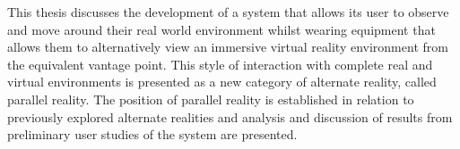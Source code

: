 This thesis discusses the development of a system that allows its user to observe and move around their real world environment whilst wearing equipment that allows them to alternatively view an immersive virtual reality environment from the equivalent vantage point. This style of interaction with complete real and virtual environments is presented as a new category of alternate reality, called parallel reality. The position of parallel reality is established in relation to previously explored alternate realities and analysis and discussion of results from preliminary user studies of the system are presented.
